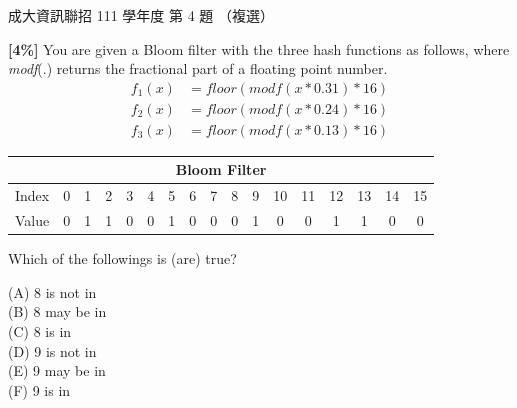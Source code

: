 \begin{pastexam}[label={px:ncku-111-prog-04}]{成大資訊聯招 111 學年度 第 4 題}
（複選）

\textbf{[4\%]} You are given a Bloom filter with the three hash functions as follows, where \textit{modf}(.) returns the fractional part of a floating point number.
\[
\begin{aligned}
f_1(x) &= floor(modf(x*0.31)*16)\\
f_2(x) &= floor(modf(x*0.24)*16)\\
f_3(x) &= floor(modf(x*0.13)*16)
\end{aligned}
\]
\begin{center}\small
\begin{tabular}{|c|*{16}{c|}}
\hline
\multicolumn{17}{|c|}{Bloom Filter}\\ \hline
Index & 0 & 1 & 2 & 3 & 4 & 5 & 6 & 7 & 8 & 9 & 10 & 11 & 12 & 13 & 14 & 15 \\ \hline
Value & 0 & 1 & 1 & 0 & 0 & 1 & 0 & 0 & 0 & 1 & 0 & 0 & 1 & 1 & 0 & 0 \\ \hline
\end{tabular}
\end{center}
\smallskip
Which of the followings is (are) true?

(A) 8 is not in\\
(B) 8 may be in\\
(C) 8 is in\\
(D) 9 is not in\\
(E) 9 may be in\\
(F) 9 is in
\end{pastexam}


